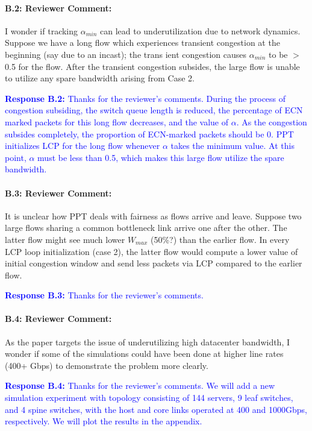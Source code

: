 \documentclass[12pt,one-column]{article}
\begin{document}
{\it \paragraph{B.2: Reviewer Comment:} I wonder if tracking $\alpha_{min}$ can lead to underutilization due to network dynamics. Suppose we have a long flow which experiences transient congestion at the beginning (say due to an incast); the trans ient congestion causes $\alpha_{min}$ to be $>$ 0.5 for the flow. After the transient congestion subsides, the large flow is unable to utilize any spare bandwidth arising from Case 2.}

\noindent\textcolor{blue}{\textbf{Response B.2:}
Thanks for the reviewer’s comments. 
During the process of congestion subsiding, the switch queue length is reduced, the percentage of ECN marked packets for this long flow decreases, and the value of $\alpha$.
As the congestion subsides completely, the proportion of ECN-marked packets should be 0.
PPT initializes LCP for the long flow whenever $\alpha$ takes the minimum value.
At this point, $\alpha$ must be less than 0.5, which makes this large flow utilize the spare bandwidth.
}

{\it \paragraph{B.3: Reviewer Comment:} It is unclear how PPT deals with fairness as flows arrive and leave. Suppose two large flows sharing a common bottleneck link arrive one after the other. The latter flow might see much lower $W_{max}$ (50\%?) than the earlier flow. In every LCP loop initialization (case 2), the latter flow would compute a lower value of initial congestion window and send less packets via LCP compared to the earlier flow.}


\noindent\textcolor{blue}{\textbf{Response B.3:}
Thanks for the reviewer’s comments. 
}

{\it \paragraph{B.4: Reviewer Comment:} As the paper targets the issue of underutilizing high datacenter bandwidth, I wonder if some of the simulations could have been done at higher line rates (400+ Gbps) to demonstrate the problem more clearly.}


\noindent\textcolor{blue}{\textbf{Response B.4:}
Thanks for the reviewer’s comments. 
We will add a new simulation experiment with topology consisting of 144 servers, 9 leaf switches, and 4 spine switches, with the host and core links operated at 400 and 1000Gbps, respectively.
We will plot the results in the appendix.
}
\end{document}
